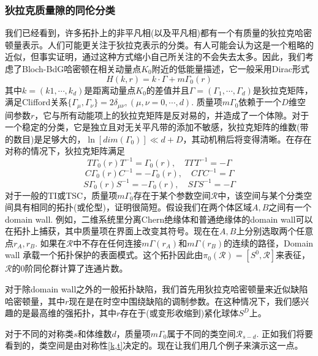 \documentclass[a4paper]{article}
\numberwithin{equation}{subsection}
\begin{document}
\subsubsection{狄拉克质量隙的同伦分类}
我们已经看到，许多拓扑上的非平凡相(以及平凡相)都有一个有质量的狄拉克哈密顿量表示。人们可能更关注于狄拉克表示的分类。有人可能会认为这是一个粗略的近似，但事实证明，通过这种方式缩小自己所关注的不会失去太多。因此，我们考虑了Bloch-BdG哈密顿在相关动量点$K_0$附近的低能量描述，它一般采用Dirac形式  
\begin{equation}
    H(k,r)=k\cdot\Gamma+m\Gamma_0(r)
\end{equation}
其中$k=(k1,\cdots,k_d)$是距离动量点$K_0$的差值并且$\Gamma=(\Gamma_1,\cdots,\Gamma_d)$是狄拉克矩阵，满足Clifford关系$\{\Gamma_\mu,\Gamma_\nu\}=2\delta_{\mu\nu},(\mu,\nu=0,\cdots,d)$. 质量项$m\Gamma_0$依赖于一个$D$维空间参数$r$，它与所有动能项上的狄拉克矩阵是反对易的，并造成了一个体隙。对于一个稳定的分类，它是独立且对无关平凡带的添加不敏感，狄拉克矩阵的维数(带的数目)是足够大的，$\ln[dim(\Gamma_0)]\ll d+D$，其动机稍后将变得清晰。在存在对称的情况下，狄拉克矩阵满足
\begin{equation}\label{k,t}
    T\Gamma_0(r)T^{-1}=\Gamma_0(r),\quad T\Gamma T^{-1}=-\Gamma
\end{equation}
\begin{equation}
    C\Gamma_0(r)C^{-1}=-\Gamma_0(r),\quad C\Gamma C^{-1}=\Gamma
\end{equation}
\begin{equation}
    S\Gamma_0(r)S^{-1}=-\Gamma_0(r),\quad S\Gamma S^{-1}=-\Gamma
\end{equation}
对于一般的TI或TSC，质量项$mΓ_0$存在于某个参数空间$\mathcal{R}$中，该空间与某个分类空间具有相同的拓扑(或伦型)，证明很简短。假设我们在两个体区域$A,B$之间有一个domain wall. 例如，二维系统里分离Chern绝缘体和普通绝缘体的domain wall可以在拓扑上捕获，其中质量项在界面上改变其符号。现在在$A,B$上分别选取两个任意点$r_A,r_B$. 如果在$\mathcal{R}$中不存在任何连接$m\Gamma(r_A)$和$m\Gamma(r_B)$的连续的路径，Domain wall 承载一个拓扑保护的表面模式。这个拓扑因此由$\pi_0(\mathcal{R})=[S^0,\mathcal{R}]$来表征，$\mathcal{R}$的$0$阶同伦群计算了连通片数。

对于除domain wall之外的一般拓扑缺陷，我们首先用狄拉克哈密顿量来近似缺陷哈密顿量，其中$r$现在是在时空中围绕缺陷的调制参数。在这种情况下，我们感兴趣的是最高维的强拓扑，其中$r$存在于(或变形收缩到)紧化球体$S^D$上。

对于不同的对称类$s$和体维数$d$，质量项$m\Gamma_0$属于不同的类空间$\mathcal{R}_{s-d}$. 正如我们将要看到的，类空间是由对称性\eqref{k,t}决定的。现在让我们用几个例子来演示这一点。
\end{document}
